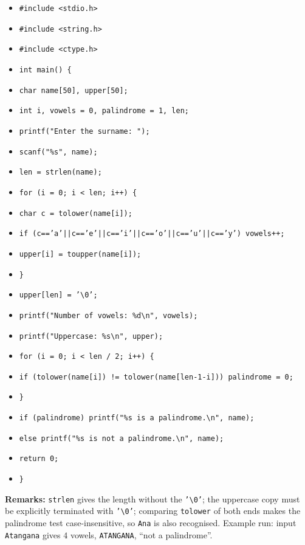 \documentclass[11pt]{article}
\begin{document}
\begin{corrige}
\begin{itemize}
\item \texttt{\#include <stdio.h>}
\item \texttt{\#include <string.h>}
\item \texttt{\#include <ctype.h>}
\item \texttt{int main() \{}
\item \texttt{\quad char name[50], upper[50];}
\item \texttt{\quad int i, vowels = 0, palindrome = 1, len;}
\item \texttt{\quad printf("Enter the surname: ");}
\item \texttt{\quad scanf("\%s", name);}
\item \texttt{\quad len = strlen(name);}
\item \texttt{\quad for (i = 0; i < len; i++) \{}
\item \texttt{\quad\quad char c = tolower(name[i]);}
\item \texttt{\quad\quad if (c=='a'||c=='e'||c=='i'||c=='o'||c=='u'||c=='y') vowels++;}
\item \texttt{\quad\quad upper[i] = toupper(name[i]);}
\item \texttt{\quad \}}
\item \texttt{\quad upper[len] = '\textbackslash 0';}
\item \texttt{\quad printf("Number of vowels: \%d\textbackslash n", vowels);}
\item \texttt{\quad printf("Uppercase: \%s\textbackslash n", upper);}
\item \texttt{\quad for (i = 0; i < len / 2; i++) \{}
\item \texttt{\quad\quad if (tolower(name[i]) != tolower(name[len-1-i])) palindrome = 0;}
\item \texttt{\quad \}}
\item \texttt{\quad if (palindrome) printf("\%s is a palindrome.\textbackslash n", name);}
\item \texttt{\quad else printf("\%s is not a palindrome.\textbackslash n", name);}
\item \texttt{\quad return 0;}
\item \texttt{\}}
\end{itemize}
\textbf{Remarks:} \texttt{strlen} gives the length without the \texttt{'\textbackslash 0'}; the uppercase copy must be explicitly terminated with \texttt{'\textbackslash 0'}; comparing \texttt{tolower} of both ends makes the palindrome test case-insensitive, so \texttt{Ana} is also recognised. Example run: input \texttt{Atangana} gives $4$ vowels, \texttt{ATANGANA}, ``not a palindrome''.
\end{corrige}
\end{document}
